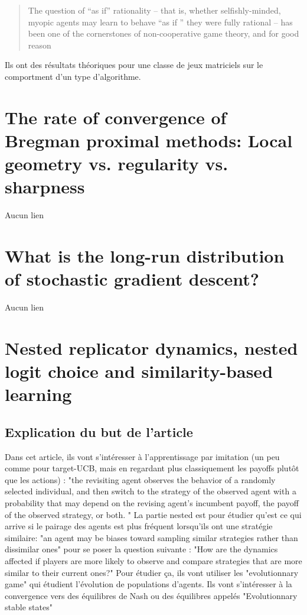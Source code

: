 \documentclass{article}
\begin{document}
\begin{quote}
    The question of “as if” rationality – that is, whether selfishly-minded, myopic agents
may learn to behave “as if ” they were fully rational – has been one of the cornerstones of
non-cooperative game theory, and for good reason
\end{quote}

Ils ont des résultats théoriques pour une classe de jeux matriciels sur le comportment d'un type d'algorithme. 


\section{The rate of convergence of Bregman proximal methods: Local geometry vs. regularity vs. sharpness \cite{azizian_rate_2024}}
Aucun lien 

\section{What is the long-run distribution of stochastic gradient descent? \cite{azizian_what_2024}}
Aucun lien 

\section{Nested replicator dynamics, nested logit choice and similarity-based learning \cite{mertikopoulos_nested_2024}}
\subsection{Explication du but de l'article}
Dans cet article, ils vont s'intéresser à l'apprentissage par imitation (un peu comme pour target-UCB, mais en regardant plus classiquement les payoffs plutôt que les actions) : "the revisiting agent observes the behavior of a randomly selected individual, and then switch to the strategy of the observed agent with a probability that may depend on the revising agent's incumbent payoff, the payoff of the observed strategy, or both. " La partie nested est pour étudier qu'est ce qui arrive si le pairage des agents est plus fréquent lorsqu'ils ont une stratégie similaire: "an agent may be biases toward sampling similar strategies rather than dissimilar ones" pour se poser la question suivante : "How are the dynamics affected if players are more likely to observe and compare strategies that are more similar to their current ones?"
Pour étudier ça, ils vont utiliser les "evolutionnary game" qui étudient l'évolution de populations d'agents. Ils vont s'intéresser à la convergence vers des équilibres de Nash ou des équilibres appelés "Evolutionnary stable states"
\end{document}
